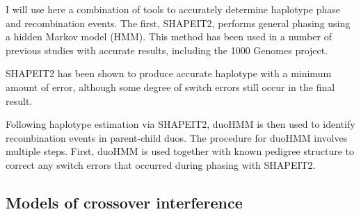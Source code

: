 I will use here a combination of tools to accurately determine haplotype phase and recombination events.
The first, SHAPEIT2\cite{Delaneau2013}, performs general phasing using a hidden Markov model (HMM).
This method has been used in a number of previous studies with accurate results, including the 1000 Genomes project\cite{1000G2015}.


SHAPEIT2 has been shown to produce accurate haplotype with a minimum amount of error, although some degree of switch errors still occur in the final result.

Following haplotype estimation via SHAPEIT2, duoHMM\cite{OConnell2014} is then used to identify recombination events in parent-child duos.
The procedure for duoHMM involves multiple steps.
First, duoHMM is used together with known pedigree structure to correct any switch errors that occurred during phasing with SHAPEIT2.




\subsection{Models of crossover interference}





\clearpage
\renewcommand{\bibname}{References}
\begingroup
    \setlength{\bibsep}{10pt}
    \linespread{1}\selectfont
    
\endgroup

